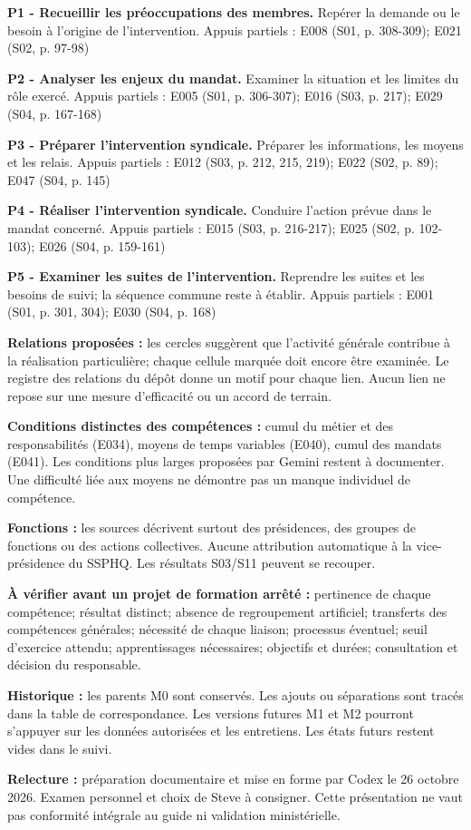 \documentclass[9pt,a4paper,landscape]{extarticle}
\begin{document}
\textbf{P1 - Recueillir les préoccupations des membres.} Repérer la demande ou le besoin à l’origine de l’intervention. Appuis partiels : E008 (S01, p. 308-309); E021 (S02, p. 97-98)\par
\textbf{P2 - Analyser les enjeux du mandat.} Examiner la situation et les limites du rôle exercé. Appuis partiels : E005 (S01, p. 306-307); E016 (S03, p. 217); E029 (S04, p. 167-168)\par
\textbf{P3 - Préparer l’intervention syndicale.} Préparer les informations, les moyens et les relais. Appuis partiels : E012 (S03, p. 212, 215, 219); E022 (S02, p. 89); E047 (S04, p. 145)\par
\textbf{P4 - Réaliser l’intervention syndicale.} Conduire l’action prévue dans le mandat concerné. Appuis partiels : E015 (S03, p. 216-217); E025 (S02, p. 102-103); E026 (S04, p. 159-161)\par
\textbf{P5 - Examiner les suites de l’intervention.} Reprendre les suites et les besoins de suivi; la séquence commune reste à établir. Appuis partiels : E001 (S01, p. 301, 304); E030 (S04, p. 168)\par
\textbf{Relations proposées :} les cercles suggèrent que l’activité générale contribue à la réalisation particulière; chaque cellule marquée doit encore être examinée. Le registre des relations du dépôt donne un motif pour chaque lien. Aucun lien ne repose sur une mesure d’efficacité ou un accord de terrain.\par
\textbf{Conditions distinctes des compétences :} cumul du métier et des responsabilités (E034), moyens de temps variables (E040), cumul des mandats (E041). Les conditions plus larges proposées par Gemini restent à documenter. Une difficulté liée aux moyens ne démontre pas un manque individuel de compétence.\par
\textbf{Fonctions :} les sources décrivent surtout des présidences, des groupes de fonctions ou des actions collectives. Aucune attribution automatique à la vice-présidence du SSPHQ. Les résultats S03/S11 peuvent se recouper.\par
\textbf{À vérifier avant un projet de formation arrêté :} pertinence de chaque compétence; résultat distinct; absence de regroupement artificiel; transferts des compétences générales; nécessité de chaque liaison; processus éventuel; seuil d’exercice attendu; apprentissages nécessaires; objectifs et durées; consultation et décision du responsable.\par
\textbf{Historique :} les parents M0 sont conservés. Les ajouts ou séparations sont tracés dans la table de correspondance. Les versions futures M1 et M2 pourront s’appuyer sur les données autorisées et les entretiens. Les états futurs restent vides dans le suivi.\par
\textbf{Relecture :} préparation documentaire et mise en forme par Codex le 26 octobre 2026. Examen personnel et choix de Steve à consigner. Cette présentation ne vaut pas conformité intégrale au guide ni validation ministérielle.
\end{document}
